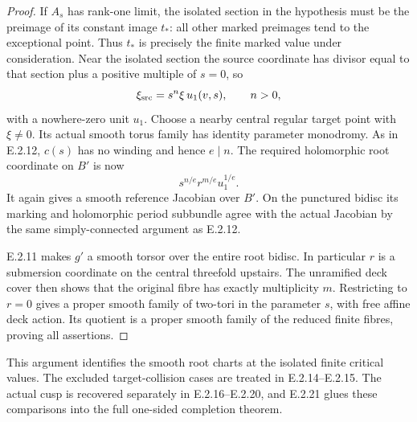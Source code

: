 \begin{proof}
If $A_s$ has rank-one limit, the isolated
section in the hypothesis must be the
preimage of its constant image $t_*$:
all other marked preimages tend to the
exceptional point.  Thus $t_*$ is precisely
the finite marked value under consideration.
Near the isolated section the source
coordinate has divisor equal to that section
plus a positive multiple of $s=0$, so
\[
 \xi_{\rm src}=s^n\xi\,u_1(v,s),\qquad n>0,
\]
with a nowhere-zero unit $u_1$.  Choose a
nearby central regular target point with
$\xi\ne0$.  Its actual smooth torus family
has identity parameter monodromy.  As in
E.2.12, $c(s)$ has no winding and hence
$e\mid n$.  The required holomorphic root
coordinate on $B'$ is now
\[
 s^{n/e}r^{m/e}u_1^{1/e}.
\]
It again gives a smooth reference Jacobian
over $B'$.  On the punctured bidisc its
marking and holomorphic period subbundle
agree with the actual Jacobian by the same
simply-connected argument as E.2.12.

E.2.11 makes $g'$ a smooth torsor over the
entire root bidisc.  In particular $r$ is
a submersion coordinate on the central
threefold upstairs.  The unramified deck
cover then shows that the original fibre
has exactly multiplicity $m$.  Restricting
to $r=0$ gives a proper smooth family of
two-tori in the parameter $s$, with free
affine deck action.  Its quotient is a
proper smooth family of the reduced finite
fibres, proving all assertions.
\end{proof}

\begin{remark}
This argument identifies the smooth root charts
at the isolated finite critical values.  The
excluded target-collision cases are treated in
E.2.14--E.2.15.  The actual cusp is recovered
separately in E.2.16--E.2.20, and E.2.21 glues
these comparisons into the full one-sided
completion theorem.
\end{remark}

